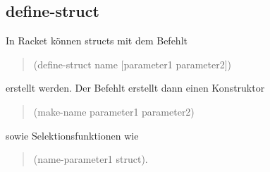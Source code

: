 \documentclass[../main.tex]{subfiles}
\begin{document}
        \subsection{define-struct}
            In Racket können structs mit dem Befehlt
            \begin{quote}
                (define-struct name [parameter1 parameter2])
            \end{quote}
            erstellt werden. Der Befehlt erstellt dann einen Konstruktor
            \begin{quote}
                (make-name parameter1 parameter2)
            \end{quote}
            sowie Selektionsfunktionen wie
            \begin{quote}
                (name-parameter1 struct).
            \end{quote}
\end{document}
